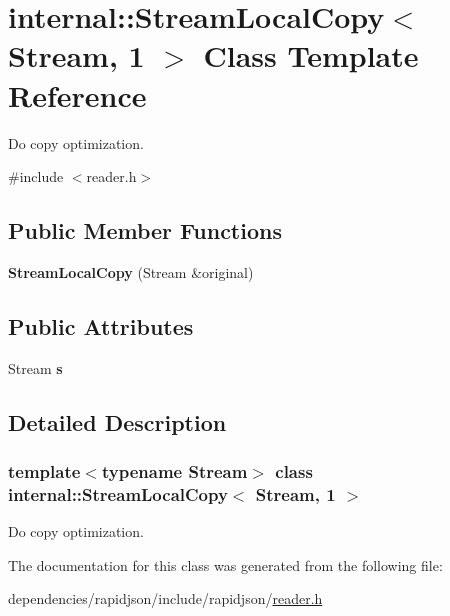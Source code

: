 \hypertarget{classinternal_1_1_stream_local_copy_3_01_stream_00_011_01_4}{}\section{internal\+:\+:Stream\+Local\+Copy$<$ Stream, 1 $>$ Class Template Reference}
\label{classinternal_1_1_stream_local_copy_3_01_stream_00_011_01_4}


Do copy optimization.  




{\ttfamily \#include $<$reader.\+h$>$}

\subsection*{Public Member Functions}
\begin{DoxyCompactItemize}
\item 
\mbox{\label{classinternal_1_1_stream_local_copy_3_01_stream_00_011_01_4_aba475fed3eecc9f77ff059fdb7fe2a32}} 
{\bfseries Stream\+Local\+Copy} (Stream \&original)
\end{DoxyCompactItemize}
\subsection*{Public Attributes}
\begin{DoxyCompactItemize}
\item 
\mbox{\label{classinternal_1_1_stream_local_copy_3_01_stream_00_011_01_4_a1d3e8ae8756325df25715d4ffb9c1b44}} 
Stream {\bfseries s}
\end{DoxyCompactItemize}


\subsection{Detailed Description}
\subsubsection*{template$<$typename Stream$>$\newline
class internal\+::\+Stream\+Local\+Copy$<$ Stream, 1 $>$}

Do copy optimization. 

The documentation for this class was generated from the following file\+:\begin{DoxyCompactItemize}
\item 
dependencies/rapidjson/include/rapidjson/\hyperlink{reader_8h}{reader.\+h}\end{DoxyCompactItemize}
